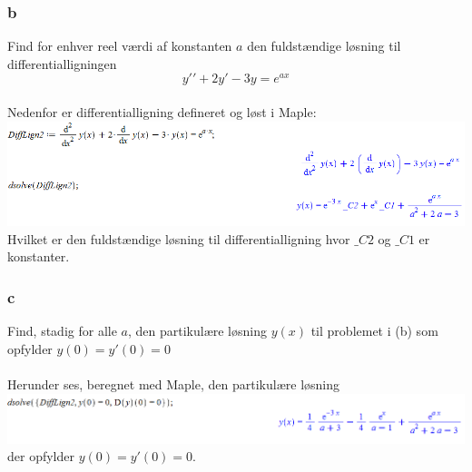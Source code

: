 \documentclass[12pt]{article}
\begin{document}
\subsubsection*{b}
Find for enhver reel værdi af konstanten $a$ den fuldstændige løsning til differentialligningen
$$y\prime\prime+2y\prime-3y=e^{ax}$$
\\
Nedenfor er differentialligning defineret og løst i Maple:\\
\includegraphics[scale=0.6]{42b1}
Hvilket er den fuldstændige løsning til differentialligning hvor $\_C2$ og $\_C1$ er konstanter.

\subsubsection*{c}
Find, stadig for alle $a$, den partikulære løsning $y(x)$ til problemet i (b) som opfylder $y(0)=y\prime(0)=0$\\
\\
Herunder ses, beregnet med Maple, den partikulære løsning\\
\includegraphics[scale=0.6]{42c1}\\
der opfylder $y(0)=y\prime(0)=0$.
\end{document}
